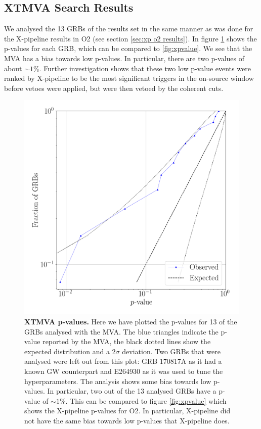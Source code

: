 \documentclass[11pt]{cuthesis}
\newcommand{\xp}{X-pipeline }
\begin{document}
\subsection{XTMVA Search Results} \label{sec:mva results}
We analysed the 13 GRBs of the results set in the same manner as was done for the \xp results in O2 (see section \ref{sec:xp o2 results}). In figure \ref{fig:mva pvalues} shows the p-values for each GRB, which can be compared to \ref{fig:xpvalue}. We see that the MVA has a bias towards low p-values. In particular, there are two p-values of about $\sim1\%$. Further investigation shows that these two low p-value events were ranked by \xp to be the most significant triggers in the on-source window before vetoes were applied, but were then vetoed by the coherent cuts. 

\begin{figure} %
\begin{center}
\includegraphics[width=0.8\linewidth]{mva_pvalue.png}
\end{center}
\caption{\textbf{XTMVA p-values.} Here we have plotted the p-values for 13 of the GRBs analysed with the MVA. The blue triangles indicate the p-value reported by the MVA, the black dotted lines show the expected distribution and a $2\sigma$ deviation. Two GRBs that were analysed were left out from this plot: GRB 170817A as it had a known GW counterpart and E264930 as it was used to tune the hyperparameters. The analysis shows some bias towards low p-values. In particular, two out of the 13 analysed GRBs have a p-value of $\sim1\%$. This can be compared to figure \ref{fig:xpvalue} which shows the \xp p-values for O2. In particular, \xp did not have the same bias towards low p-values that \xp does.}
\label{fig:mva pvalues}
\end{figure}
\end{document}
